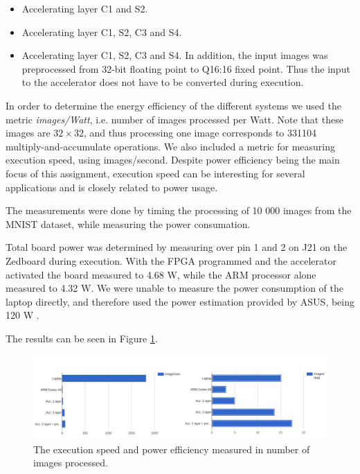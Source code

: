 \begin{itemize}
	\item Accelerating layer C1 and S2. 
	\item Accelerating layer C1, S2, C3 and S4.
	\item Accelerating layer C1, S2, C3 and S4. In addition, the input images was preprocessed from 32-bit floating point to Q16:16 fixed point. Thus the input to the accelerator does not have to be converted during execution.
\end{itemize}

In order to determine the energy efficiency of the different systems we used the metric \textit{images/Watt}, i.e. number of images processed per Watt. Note that these images are $ 32 \times 32 $, and thus processing one image corresponds to 331104 multiply-and-accumulate operations. We also included a metric for measuring execution speed, using images/second. Despite power efficiency being the main focus of this assignment, execution speed can be interesting for several applications and is closely related to power usage. 

The measurements were done by timing the processing of 10 000 images from the MNIST dataset, while measuring the power consumation. 

Total board power was determined by measuring over pin 1 and 2 on J21 on the Zedboard during execution. With the FPGA programmed and the accelerator activated the board measured to 4.68 W, while the ARM processor alone measured to 4.32 W. We were unable to measure the power consumption of the laptop directly, and therefore used the power estimation provided by ASUS, being 120 W \cite{ASUS}.  

The results can be seen in Figure \ref{fig_results_all_layers}.

\begin{figure}[h!]
	\centering
	\includegraphics[width=1.0\textwidth]{Figures/Results/results_all_layers}
	\caption{The execution speed and power efficiency measured in number of images processed.}
	\label{fig_results_all_layers}
\end{figure}

